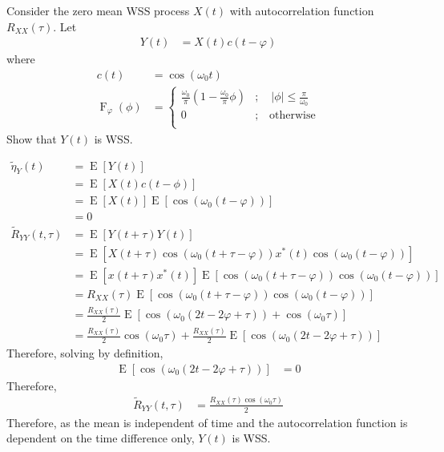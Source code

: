 \documentclass[titlepage, fleqn, a4paper, 12pt, twoside]{article}
\theoremstyle{definition}
\theoremstyle{theorem}
\renewcommand{\tilde}{\widetilde}
\DeclareMathOperator{\cdf}{\mathrm{F}}
\DeclareMathOperator{\expct}{\mathrm{E}}
\begin{document}
\begin{question}
	Consider the zero mean WSS process $X(t)$ with autocorrelation function $R_{X X}(\tau)$.
	Let
	\begin{align*}
		Y(t) &= X(t) c(t - \varphi)
	\end{align*}
	where
	\begin{align*}
		c(t) &= \cos(\omega_0 t)\\
		\cdf_{\varphi}(\phi) &=
			\begin{cases}
				\frac{\omega_0}{\pi} \left( 1 - \frac{\omega_0}{\pi} \phi \right) &;\quad |\phi| \le \frac{\pi}{\omega_0}\\
				0 &;\quad \text{otherwise}\\
			\end{cases}
	\end{align*}
	Show that $Y(t)$ is WSS.
\end{question}

\begin{solution}
	\begin{align*}
		\tilde{\eta}_Y(t) &= \expct\left[ Y(t) \right]\\
		&= \expct\left[ X(t) c(t - \phi) \right]\\
		&= \expct\left[ X(t) \right] \expct\left[ \cos\left( \omega_0 (t - \varphi) \right) \right]\\
		&= 0\\
		\tilde{R}_{Y Y}(t,\tau) &= \expct\left[ Y(t + \tau) Y(t) \right]\\
		&= \expct\left[ X(t + \tau) \cos\left( \omega_0 (t + \tau - \varphi) \right) x^*(t) \cos\left( \omega_0 (t - \varphi) \right) \right]\\
		&= \expct\left[ x(t + \tau) x^*(t) \right] \expct\left[ \cos\left( \omega_0 (t + \tau - \varphi) \right) \cos\left( \omega_0 (t - \varphi) \right) \right]\\
		&= R_{X X}(\tau) \expct\left[ \cos\left( \omega_0 (t + \tau - \varphi) \right) \cos\left( \omega_0 (t - \varphi) \right) \right]\\
		&= \frac{R_{X X}(\tau)}{2} \expct\left[ \cos\left( \omega_0 (2 t - 2 \varphi + \tau) \right) + \cos(\omega_0 \tau) \right]\\
		&= \frac{R_{X X}(\tau)}{2} \cos(\omega_0 \tau) + \frac{R_{X X}(\tau)}{2} \expct\left[ \cos\left( \omega_0 (2 t - 2 \varphi + \tau) \right) \right]
	\end{align*}
	Therefore, solving by definition,
	\begin{align*}
		\expct\left[ \cos\left( \omega_0 (2 t - 2 \varphi + \tau) \right) \right] &= 0
	\end{align*}
	Therefore,
	\begin{align*}
		\tilde{R}_{Y Y}(t,\tau) &= \frac{R_{X X}(\tau) \cos(\omega_0 \tau)}{2}
	\end{align*}
	Therefore, as the mean is independent of time and the autocorrelation function is dependent on the time difference only, $Y(t)$ is WSS.
\end{solution}
\end{document}
